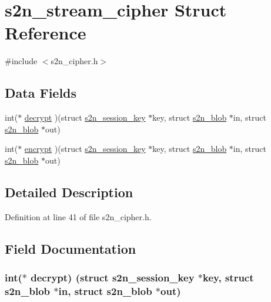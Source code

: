 \hypertarget{structs2n__stream__cipher}{}\section{s2n\+\_\+stream\+\_\+cipher Struct Reference}
\label{structs2n__stream__cipher}


{\ttfamily \#include $<$s2n\+\_\+cipher.\+h$>$}

\subsection*{Data Fields}
\begin{DoxyCompactItemize}
\item 
int($\ast$ \hyperlink{structs2n__stream__cipher_a4fb65037e99ad954a92255cebbd26895}{decrypt} )(struct \hyperlink{structs2n__session__key}{s2n\+\_\+session\+\_\+key} $\ast$key, struct \hyperlink{structs2n__blob}{s2n\+\_\+blob} $\ast$in, struct \hyperlink{structs2n__blob}{s2n\+\_\+blob} $\ast$out)
\item 
int($\ast$ \hyperlink{structs2n__stream__cipher_a877aa5eb78a3137b4968ed5280e2b9a3}{encrypt} )(struct \hyperlink{structs2n__session__key}{s2n\+\_\+session\+\_\+key} $\ast$key, struct \hyperlink{structs2n__blob}{s2n\+\_\+blob} $\ast$in, struct \hyperlink{structs2n__blob}{s2n\+\_\+blob} $\ast$out)
\end{DoxyCompactItemize}


\subsection{Detailed Description}


Definition at line 41 of file s2n\+\_\+cipher.\+h.



\subsection{Field Documentation}
\subsubsection[{\texorpdfstring{decrypt}{decrypt}}]{\setlength{\rightskip}{0pt plus 5cm}int($\ast$ decrypt) (struct {\bf s2n\+\_\+session\+\_\+key} $\ast$key, struct {\bf s2n\+\_\+blob} $\ast$in, struct {\bf s2n\+\_\+blob} $\ast$out)}\hypertarget{structs2n__stream__cipher_a4fb65037e99ad954a92255cebbd26895}{}\label{structs2n__stream__cipher_a4fb65037e99ad954a92255cebbd26895}


